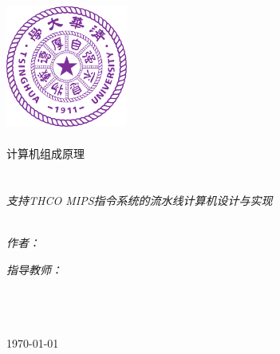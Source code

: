 \documentclass[
11pt, %
oneside, %
english, %
singlespacing, %
headsepline, %
]{MastersDoctoralThesis} %
\author{董胤蓬、钱雨杰、桥本优} %
\begin{document}
\frontmatter %

\pagestyle{plain} %


\begin{titlepage}
\begin{center}
\includegraphics[width=0.3\textwidth]{Figures/thu.png}\\[1cm]
\textsc{\LARGE \univname}\\[0.8cm] %
\textsc{\LARGE 计算机组成原理}\\[0.5 cm] %

\HRule \\[0.4cm] %
{\huge \bfseries \ttitle}\\[0.4cm] %
\large \textit{支持THCO MIPS指令系统的流水线计算机设计与实现}\\[0.3cm] %
\HRule \\[1.5cm] %
 
\begin{minipage}{0.4\textwidth}
\begin{flushleft} \large
\emph{作者：}\\[0.4cm] 
\authorname %
\end{flushleft}
\end{minipage}
\begin{minipage}{0.4\textwidth}
\begin{flushright} \large
\emph{指导教师：} \\[0.4cm]
\supname %
\end{flushright}
\end{minipage}\\[4cm]

\univname\\[0.1cm]\deptname\\[2cm] %
 
{\large \today}\\[3cm] %
 
\vfill
\end{center}
\end{titlepage}
\end{document}
